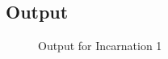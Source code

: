     \subsection{Output}
    \begin{figure}[h!]
      \centering
      \caption{Output for Incarnation 1}
      \label{fig:Text-based output}
    \end{figure}
    \pagebreak

